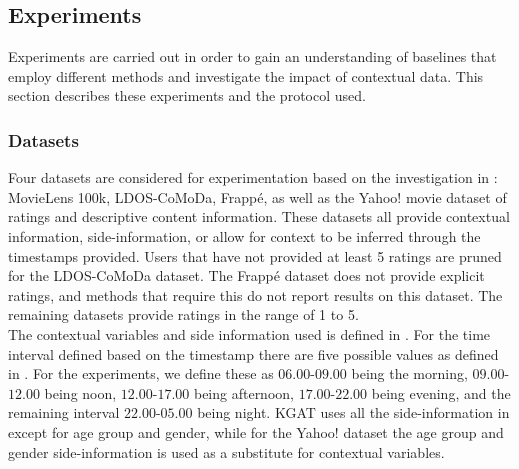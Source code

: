\subsection{Experiments}\label{subsec:experimentprotocol}
Experiments are carried out in order to gain an understanding of baselines that employ different methods and investigate the impact of contextual data.
This section describes these experiments and the protocol used.

\subsubsection{Datasets}\label{subsub:datadiscretization}
Four datasets are considered for experimentation based on the investigation in : MovieLens 100k, LDOS-CoMoDa, Frappé, as well as the Yahoo! movie dataset of ratings and descriptive content information\cite{Yahoo!-movie}.
These datasets all provide contextual information, side-information, or allow for context to be inferred through the timestamps provided.
Users that have not provided at least 5 ratings are pruned for the LDOS-CoMoDa dataset.
The Frappé dataset does not provide explicit ratings, and methods that require this do not report results on this dataset.
The remaining datasets provide ratings in the range of 1 to 5.
\\
The contextual variables and side information used is defined in .
For the time interval defined based on the timestamp there are five possible values as defined in .
For the experiments, we define these as $06.00$-$09.00$ being the morning, $09.00$-$12.00$ being noon, $12.00$-$17.00$ being afternoon, $17.00$-$22.00$ being evening, and the remaining interval $22.00$-$05.00$ being night.
KGAT uses all the side-information in  except for age group and gender, while for the Yahoo! dataset the age group and gender side-information is used as a substitute for contextual variables. 
\\

